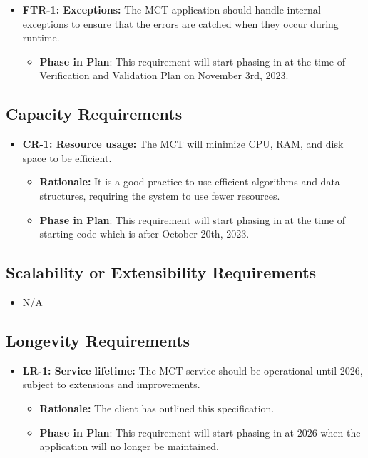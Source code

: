 \documentclass[12pt]{article}
\begin{document}
\begin{itemize}
    \item \textbf{FTR-1: Exceptions: }The MCT application should handle internal exceptions to ensure that the errors are catched when they occur during runtime.
    \begin{itemize}
        \item \textbf{Phase in Plan}: This requirement will start phasing in at the time of Verification and Validation Plan on November 3rd, 2023.
    \end{itemize}
\end{itemize}


\subsection{Capacity Requirements}

\begin{itemize}
    \item \textbf{CR-1: Resource usage:} The MCT will minimize CPU, RAM, and disk space to be efficient.
    \begin{itemize}
        \item \textbf{Rationale: }It is a good practice to use efficient algorithms and data structures, requiring the system to use fewer resources.
        \item \textbf{Phase in Plan}: This requirement will start phasing in at the time of starting code which is after October 20th, 2023.
    \end{itemize}
\end{itemize}


\subsection{Scalability or Extensibility Requirements}
\begin{itemize}
    \item N/A
\end{itemize}
\subsection{Longevity Requirements}

\begin{itemize}
    \item \textbf{LR-1: Service lifetime:} The MCT service should be operational until 2026, subject to extensions and improvements.
    \begin{itemize}
        \item \textbf{Rationale: }The client has outlined this specification.
        \item \textbf{Phase in Plan}: This requirement will start phasing in at 2026 when the application will no longer be maintained.
    \end{itemize}
\end{itemize}
\end{document}
